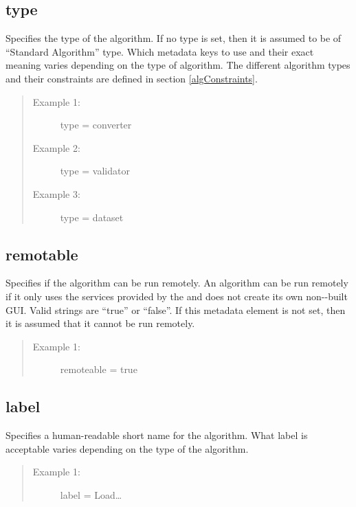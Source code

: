 \subsection*{type} 
Specifies the type of the algorithm. If no type is set, then
it is assumed to be of ``Standard Algorithm'' type. Which metadata keys to use
and their exact meaning varies depending on the type of algorithm. The different
algorithm types and their constraints are defined in section
\ref{algConstraints}.

\begin{quote}
\begin{description}
  \item[Example 1:] type = converter
  \item[Example 2:] type = validator
  \item[Example 3:] type = dataset 
\end{description}
\end{quote}


\subsection*{remotable}
Specifies if the algorithm can be run remotely. An algorithm can be run
remotely if it only uses the services provided by the 
and does not create its own non--built GUI. Valid
strings are ``true'' or ``false''. If this metadata element is not set, then
it is assumed that it cannot be run remotely.

\begin{quote}
\begin{description}
  \item[Example 1:] remoteable = true 
\end{description}
\end{quote}


\subsection*{label}
Specifies a human-readable short name for the algorithm. What label is
acceptable varies depending on the type of the algorithm. 

\begin{quote}
\begin{description}
  \item[Example 1:] label = Load\ldots 
\end{description}
\end{quote}


